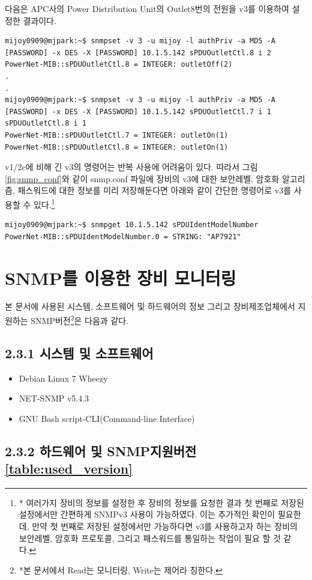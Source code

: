 \documentclass[11pt
  , a4paper
  , article
  , oneside
]{memoir}
\begin{document}
다음은 APC사의 Power Distribution Unit의 Outlet8번의 전원을 v3를 이용하여 설정한 결과이다. 

\begin{lstlisting}[style=termstyle]
mijoy0909@mjpark:~$ snmpset -v 3 -u mijoy -l authPriv -a MD5 -A [PASSWORD] -x DES -X [PASSWORD] 10.1.5.142 sPDUOutletCtl.8 i 2
PowerNet-MIB::sPDUOutletCtl.8 = INTEGER: outletOff(2)
.
.
mijoy0909@mjpark:~$ snmpset -v 3 -u mijoy -l authPriv -a MD5 -A [PASSWORD] -x DES -X [PASSWORD] 10.1.5.142 sPDUOutletCtl.7 i 1 sPDUOutletCtl.8 i 1
PowerNet-MIB::sPDUOutletCtl.7 = INTEGER: outletOn(1)
PowerNet-MIB::sPDUOutletCtl.8 = INTEGER: outletOn(1)
\end{lstlisting}

v1/2c에 비해 긴 v3의 명령어는 반복 사용에 어려움이 있다. 따라서 그림 \ref{fig:snmp_conf}와 같이 snmp.conf 파일에 장비의 v3에 대한 보안레벨, 암호화 알고리즘, 패스워드에 대한 정보를 미리 저장해둔다면 아래와 같이 간단한 명령어로 v3를 사용할 수 있다.\footnote{* 여러가지 장비의 정보를 설정한 후 장비의 정보를 요청한 결과 첫 번째로 저장된 설정에서만 간편하게 SNMPv3 사용이 가능하였다. 이는 추가적인 확인이 필요한데, 만약 첫 번째로 저장된 설정에서만 가능하다면 v3를 사용하고자 하는 장비의 보안레벨, 암호화 프로토콜, 그리고 패스워드를 통일하는 작업이 필요 할 것 같다.}

\begin{lstlisting}[style=termstyle]
mijoy0909@mjpark:~$ snmpget 10.1.5.142 sPDUIdentModelNumber
PowerNet-MIB::sPDUIdentModelNumber.0 = STRING: "AP7921"
\end{lstlisting}


\clearpage
\section{SNMP를 이용한 장비 모니터링}
본 문서에 사용된 시스템, 소프트웨어 및 하드웨어의 정보 그리고 장비제조업체에서 지원하는 SNMP버전\footnote{*본 문서에서 Read는 모니터링, Write는 제어라 칭한다.}은 다음과 같다.
\subsection{2.3.1 시스템 및 소프트웨어}
\begin{itemize}
\item Debian Linux 7 Wheezy
\item NET-SNMP v5.4.3
\item GNU Bash script-CLI(Command-line Interface) 
\end{itemize}

\subsection{2.3.2 하드웨어 및 SNMP지원버전\ref{table:used_version}}
\end{document}
